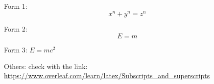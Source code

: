 Form 1:
\[ x^n + y^n = z^n \]

Form 2:
\begin{equation}
E=m
\end{equation}

Form 3:
$E=mc^2$

\vspace{8mm}
Others: check with the link: 
\url{https://www.overleaf.com/learn/latex/Subscripts_and_superscripts}
